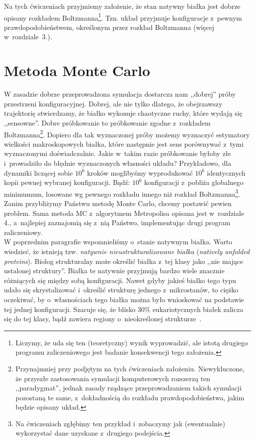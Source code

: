 \documentclass[a4paper,11pt,twoside]{book}
\begin{document}
Na tych ćwiczeniach przyjmiemy założenie, że stan natywny białka jest dobrze opisany rozkładem Boltzmanna\footnote{Liczymy, że uda się ten (teoretyczny) wynik wyprowadzić, ale istotą drugiego programu zaliczeniowego jest badanie konsekwencji tego założenia.}. Tzn. układ przyjmuje konfiguracje z~pewnym prawdopodobieństwem, określonym przez rozkład Boltzmanna (więcej w~rozdziale~3.).\\

\section{Metoda Monte Carlo}
W zasadzie dobrze przeprowadzona symulacja dostarcza nam ,,dobrej'' próby przestrzeni konfiguracyjnej. Dobrej, ale nie tylko dlatego, że obejrzawszy trajektorię stwierdzamy, że białko wykonuje chaotyczne ruchy, które wydają się ,,sensowne''. Dobre próbkowanie to próbkowanie zgodne z~rozkładem Boltzmanna\footnote{Przynajmniej przy podjętym na tych ćwiczeniach założeniu. Niewykluczone, że przyszłe zastosowania symulacji komputerowych rozszerzą ten ,,paradygmat'', jednak zasady rządzące przeprowadzaniem takich symulacji pozostaną te same, z~dokładnością do rozkładu prawdopodobieństwa, jakim będzie opisany układ.}. Dopiero dla tak wyznaczonej próby możemy wyznaczyć estymatory wielkości makroskopowych białka, które następnie jest sens porównywać z~tymi wyznaczonymi doświadczalnie. Jakie w~takim razie próbkowanie byłoby złe i~prowadziło do błędnie wyznaczonych własności układu? Przykładowo, dla dynamiki liczącej sobie $10^6$ kroków moglibyśmy wyprodukować $10^6$ identycznych kopii pewnej wybranej konfiguracji. Bądź: $10^6$ konfiguracji z~pobliża globalnego minimumum, losowane wg pewnego rozkładu innego niż rozkład Boltzmanna\footnote{Na ćwiczeniach zgłębimy ten przykład i~zobaczymy jak (ewentualnie) wykorzystać dane uzyskane z~drugiego podejścia.}.\\

Zanim przybliżymy Państwu metodę Monte Carlo, chcemy postawić pewien problem. Sama metoda MC z~algorytmem Metropolisa opisana jest w~rozdziale 4., a~najlepiej zaznajomią się z~nią Państwo, implementując drugi program zaliczeniowy.\\

W poprzednim paragrafie wspomnieliśmy o~stanie natywnym białka. Warto wiedzieć, że istnieją tzw. \emph{natywnie nieustrukturalizowane białka} (\emph{natively unfolded proteins}). Biolog strukturalny może określić białka z~tej klasy jako ,,nie mające ustalonej struktury''. Białka te natywnie przyjmują bardzo wiele znacznie różniących się między sobą konfiguracji. Nawet gdyby jakieś białko tego typu udało się skrystalizować i~określić strukturę jednego z~mikrostanów, to ciężko oczekiwać, by o~własnościach tego białka można było wnioskować na podstawie tej jednej konfiguracji. Szacuje się, że blisko 30\% eukariotycznych białek zalicza się do tej klasy, bądź zawiera regiony o~nieokreślonej strukturze~\cite{unfolded}.\\
\end{document}

